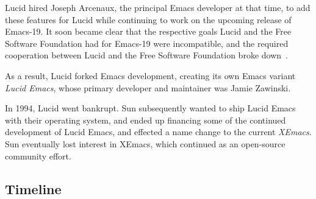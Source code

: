 \documentclass[format=acmsmall, review]{acmart}
\begin{document}
Lucid hired Joseph Arcenaux,
the principal Emacs developer at that time, to add these features
for Lucid while continuing to work on the upcoming release of Emacs-19.
It soon became clear that the respective goals Lucid and the Free
Software Foundation had for Emacs-19 were incompatible,
and the required cooperation between Lucid and
the Free Software Foundation broke down~\cite{Arcenaux-interview}.

As a result, Lucid forked Emacs development, creating its own Emacs
variant \emph{Lucid Emacs}, whose primary developer and maintainer was
Jamie Zawinski.

In 1994, Lucid went bankrupt.  Sun subsequently wanted to ship
Lucid Emacs with their operating system, and ended up financing some
of the continued development of Lucid Emacs, and effected a name
change to the current \emph{XEmacs}.
Sun eventually lost interest in XEmacs, which continued as an
open-source community effort.

\subsection{Timeline}

\newcommand \EDate [2] {#1}     %
\end{document}
